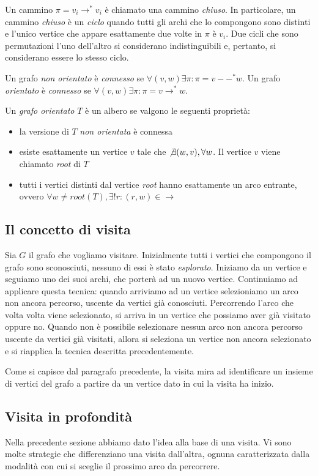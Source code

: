 Un cammino $\pi = v_{i} \rightarrow^{*} v_{i}$ \`e chiamato una
cammino \emph{chiuso}. In particolare, un cammino \emph{chiuso} \`e un
\emph{ciclo} quando tutti gli archi che lo compongono sono distinti e
l'unico vertice che appare esattamente due volte in $\pi$ \`e
$v_{i}$. Due cicli che sono permutazioni l'uno dell'altro si
considerano indistinguibili e, pertanto, si considerano essere lo
stesso ciclo.

Un grafo \emph{non orientato} \`e \emph{connesso} se $\forall (v, w)
\exists \pi: \pi = v --^{*} w$. Un grafo \emph{orientato} \`e
\emph{connesso} se $\forall (v, w) \exists \pi: \pi = v
\rightarrow^{*} w$.

Un \emph{grafo orientato} $T$ \`e un albero se valgono le seguenti
propriet\`a:
\begin{itemize}
\item la versione di $T$ \emph{non orientata} \`e connessa
\item esiste esattamente un vertice $v$ tale che $\not \exists (w, v),
  \forall w$. Il vertice $v$ viene chiamato \emph{root} di $T$
\item tutti i vertici distinti dal vertice \emph{root} hanno
  esattamente un arco entrante, ovvero $\forall w \not = root(T),
  \exists!r: (r, w) \in \rightarrow$
\end{itemize}

\subsection{Il concetto di visita}
Sia $G$ il grafo che vogliamo visitare. Inizialmente tutti i vertici
che compongono il grafo sono sconosciuti, nessuno di essi \`e stato
\emph{esplorato}. Iniziamo da un vertice e seguiamo uno dei suoi
archi, che porter\`a ad un nuovo vertice. Continuiamo ad applicare
questa tecnica: quando arriviamo ad un vertice selezioniamo un arco
non ancora percorso, uscente da vertici gi\`a conosciuti. Percorrendo
l'arco che volta volta viene selezionato, si arriva in un vertice che
possiamo aver gi\`a visitato oppure no. Quando non \`e possibile
selezionare nessun arco non ancora percorso uscente da vertici gi\`a
visitati, allora si seleziona un vertice non ancora selezionato e si
riapplica la tecnica descritta precedentemente.

Come si capisce dal paragrafo precedente, la visita mira ad
identificare un insieme di vertici del grafo a partire da un vertice
dato in cui la visita ha inizio.

\subsection{Visita in profondit\`a}
Nella precedente sezione abbiamo dato l'idea alla base di una
visita. Vi sono molte strategie che differenziano una visita
dall'altra, ognuna caratterizzata dalla modalit\`a con cui si sceglie
il prossimo arco da percorrere.

